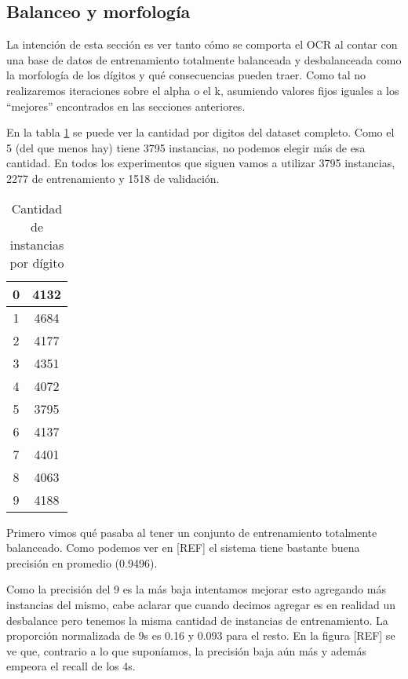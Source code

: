 \subsection{Balanceo y morfología}
La intención de esta sección es ver tanto cómo se comporta el OCR al contar con una base de datos de entrenamiento totalmente balanceada y desbalanceada como la morfología de los dígitos y qué consecuencias pueden traer. Como tal no realizaremos iteraciones sobre el alpha o el k, asumiendo valores fijos iguales a los ``mejores'' encontrados en las secciones anteriores.

En la tabla \ref{tab:totalDigitos} se puede ver la cantidad por digitos del dataset completo. Como el 5 (del que menos hay) tiene 3795 instancias, no podemos elegir más de esa cantidad. En todos los experimentos que siguen vamos a utilizar 3795 instancias, 2277 de entrenamiento y 1518 de validación.

\begin{table}[h]
\centering
\begin{tabular}{|c|c|}
\hline
0 & 4132 \\ \hline
1 & 4684 \\ \hline
2 & 4177 \\ \hline
3 & 4351 \\ \hline
4 & 4072 \\ \hline
5 & 3795 \\ \hline
6 & 4137 \\ \hline
7 & 4401 \\ \hline
8 & 4063 \\ \hline
9 & 4188 \\ \hline
\end{tabular}
\caption{Cantidad de instancias por dígito}
\label{tab:totalDigitos}
\end{table}

Primero vimos qué pasaba al tener un conjunto de entrenamiento totalmente balanceado. Como podemos ver en [REF] el sistema tiene bastante buena precisión en promedio (0.9496). %

Como la precisión del 9 es la más baja intentamos mejorar esto agregando más instancias del mismo, cabe aclarar que cuando decimos agregar es en realidad un desbalance pero tenemos la misma cantidad de instancias de entrenamiento. La proporción normalizada de 9s es 0.16 y 0.093 para el resto. En la figura [REF] se ve que, contrario a lo que suponíamos, la precisión baja aún más y además empeora el recall de los 4s.

